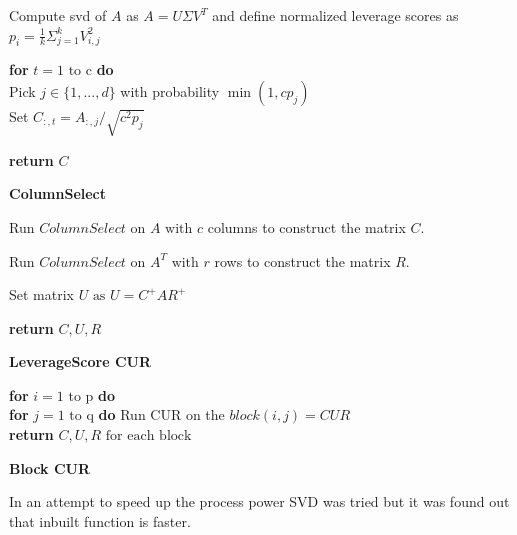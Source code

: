 \documentclass{article}
\begin{document}
\begin{algorithm}[H]

Compute svd of $A$ as $A = U\Sigma V^T$ and define normalized leverage scores as $p_i = \frac{1}{k}\Sigma^k_{j=1} V^2_{i,j} $

\textbf{for} $t = \text{1 to c} $ \textbf{do}\;\\
    Pick $j \in \{1,...,d\}$ with probability $ \min (1,c p_j)$ \;\\
    Set $C_{:,t} = A_{:,j}/\sqrt{c^2p_{j}}$ \;
    
\textbf{return} $C$ 
\caption{{\bf ColumnSelect} \label{Algorithm2}}
\end{algorithm}


\begin{algorithm}[h]
Run $ColumnSelect \text{ on } A \text{ with } c $ columns to construct the matrix $C$.

Run $ColumnSelect \text{ on } A^T \text{ with } r $  rows to construct the matrix $R$.

Set matrix $ U \text{ as } U = C^+AR^+ $ \; 

\textbf{return} $C,U,R$ 
\caption{{\bf LeverageScore CUR} \label{Algorithm3}}
\end{algorithm}

\begin{algorithm}[h]

\textbf{for} $i = \text{1 to p} $ \textbf{do}\;\\
    \textbf{for} $j = \text{1 to q} $ \textbf{do}\;
    \quad Run CUR on the $block(i,j) = CUR$\\
\textbf{return} $C,U,R \text{ for each block }$ 
\caption{{\bf Block CUR} \label{Algorithm5}}
\end{algorithm}



In an attempt to speed up the process power SVD was tried but it was found out that inbuilt function is faster.
\end{document}
